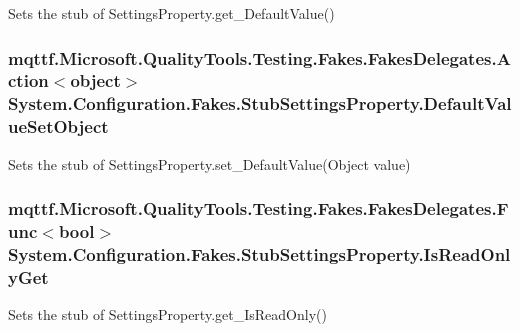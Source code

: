 Sets the stub of Settings\-Property.\-get\-\_\-\-Default\-Value()

\hypertarget{class_system_1_1_configuration_1_1_fakes_1_1_stub_settings_property_abf802041bdbb8fb209b928c41c462f81}{
\subsubsection[{Default\-Value\-Set\-Object}]{\setlength{\rightskip}{0pt plus 5cm}mqttf.\-Microsoft.\-Quality\-Tools.\-Testing.\-Fakes.\-Fakes\-Delegates.\-Action$<$object$>$ System.\-Configuration.\-Fakes.\-Stub\-Settings\-Property.\-Default\-Value\-Set\-Object}}\label{class_system_1_1_configuration_1_1_fakes_1_1_stub_settings_property_abf802041bdbb8fb209b928c41c462f81}


Sets the stub of Settings\-Property.\-set\-\_\-\-Default\-Value(\-Object value)

\hypertarget{class_system_1_1_configuration_1_1_fakes_1_1_stub_settings_property_a4ba09429c507b76cd6b8a3077ed21db3}{
\subsubsection[{Is\-Read\-Only\-Get}]{\setlength{\rightskip}{0pt plus 5cm}mqttf.\-Microsoft.\-Quality\-Tools.\-Testing.\-Fakes.\-Fakes\-Delegates.\-Func$<$bool$>$ System.\-Configuration.\-Fakes.\-Stub\-Settings\-Property.\-Is\-Read\-Only\-Get}}\label{class_system_1_1_configuration_1_1_fakes_1_1_stub_settings_property_a4ba09429c507b76cd6b8a3077ed21db3}


Sets the stub of Settings\-Property.\-get\-\_\-\-Is\-Read\-Only()

